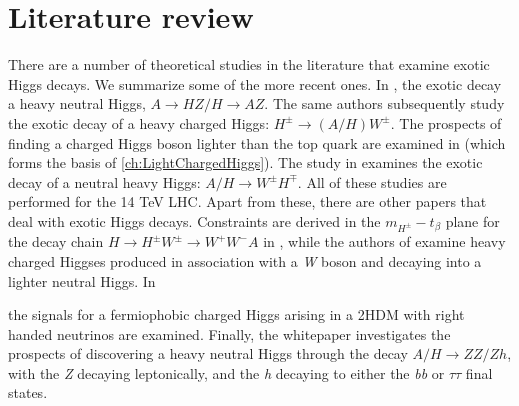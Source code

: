 \section{Literature review}
There are a number of theoretical studies in the literature that examine exotic Higgs decays. We summarize some of the more recent ones. In \cite{Coleppa2014a}, the exotic decay a heavy neutral Higgs, $A\rightarrow HZ/H\rightarrow AZ$. The same authors subsequently study the exotic decay of a heavy charged Higgs: $H^\pm\rightarrow (A/H)W^\pm$. The prospects of finding a charged Higgs boson lighter than the top quark are examined in \cite{Kling2015c} (which forms the basis of \autoref{ch:LightChargedHiggs}). The study in \cite{Li:2015lra} examines the exotic decay of a neutral heavy Higgs: $A/H\rightarrow W^\pm H^\mp$. All of these studies are performed for the 14 TeV LHC. Apart from these, there are other papers that deal with exotic Higgs decays. Constraints are derived in the $m_{H^\pm}-t_\beta$ plane for the decay chain $H\rightarrow H^\pm W^\pm\rightarrow W^+W^- A$ in \cite{Dermisek:2013cxa}, while the authors of \cite{Basso:2012st} examine heavy charged Higgses produced in association with a \emph{W} boson and decaying into a lighter neutral Higgs. In {\cite{Maitra:2014qea} the signals for a fermiophobic charged Higgs arising in a 2HDM with right handed neutrinos are examined. Finally, the whitepaper \cite{Brownson:2013lka} investigates the prospects of discovering a heavy neutral Higgs through the decay $A/H\rightarrow ZZ/Zh$, with the \emph{Z} decaying leptonically, and the \emph{h} decaying to either the \emph{bb} or $\tau\tau$ final states. 

}

